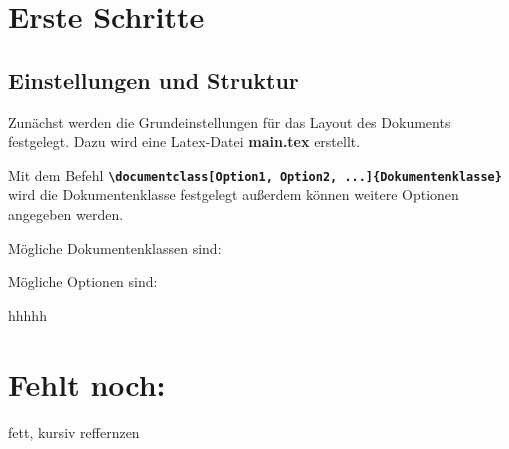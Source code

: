 \section{Erste Schritte}
\subsection{Einstellungen und Struktur}

Zunächst werden die Grundeinstellungen für das Layout des Dokuments festgelegt. Dazu wird eine Latex-Datei \textbf{main.tex} erstellt.

Mit dem Befehl \textbf{\texttt{\textbackslash documentclass[Option1, Option2, ...]\{Dokumentenklasse\}}} wird die Dokumentenklasse festgelegt außerdem können weitere Optionen angegeben werden. 

Mögliche Dokumentenklassen sind:


Mögliche Optionen sind:


hhhhh

\section{Fehlt noch:}

fett, kursiv
reffernzen
%
